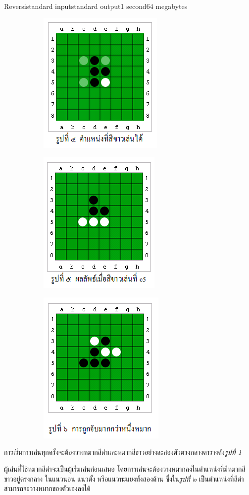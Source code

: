 \documentclass[11pt,a4paper]{article}
\begin{document}
\begin{problem}{Reversi}{standard input}{standard output}{1 second}{64 megabytes}
\begin{figure}[h]
\end{figure}
\begin{figure}[h]
\begin{subfigure}{30ex}
\centering
\includegraphics[width=25ex]{../latex/img/1034/1034-4.png}
\end{subfigure}%
\begin{subfigure}{30ex}
\centering
\includegraphics[width=25ex]{../latex/img/1034/1034-5.png}
\end{subfigure}%
\begin{subfigure}{30ex}
\centering
\includegraphics[width=25ex]{../latex/img/1034/1034-6.png}
\end{subfigure}%
\end{figure}

การเริ่มการเล่นทุกครั้งจะต้องวางหมากสีดำและหมากสีขาวอย่างละสองตัวตรงกลางตารางดัง\textit{รูปที่ 1}

ผู้เล่นที่ใช้หมากสีดำจะเป็นผู้เริ่มเล่นก่อนเสมอ โดยการเล่นจะต้องวางหมากลงในตำแหน่งที่มีหมากสีขาวอยู่ตรงกลาง ในแนวนอน แนวตั้ง หรือแนวทะแยงทั้งสองด้าน ซึ่งใน\textit{รูปที่ ๒} เป็นตำแหน่งที่สีดำสามารถจะวางหมากของตัวเองลงได้


\end{problem}
\end{document}
